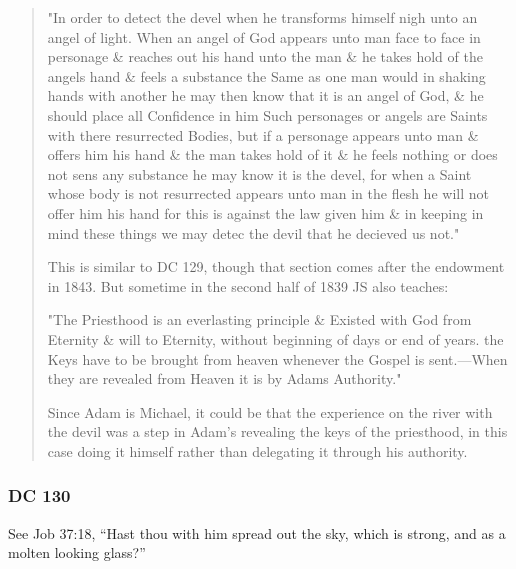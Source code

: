 \begin{compactdesc}
\begin{compactdesc}
\begin{quote}
				"In order to detect the devel when he transforms himself nigh unto an angel of light. When an angel of God appears unto man face to face in personage \& reaches out his hand unto the man \& he takes hold of the angels hand \& feels a substance the Same as one man would in shaking hands with another he may then know that it is an angel of God, \& he should place all Confidence in him Such personages or angels are Saints with there resurrected Bodies, but if a personage appears unto man \& offers him his hand \& the man takes hold of it \& he feels nothing or does not sens any substance he may know it is the devel, for when a Saint whose body is not resurrected appears unto man in the flesh he will not offer him his hand for this is against the law given him \& in keeping in mind these things we may detec the devil that he decieved us not."

				This is similar to DC 129, though that section comes after the endowment in 1843. But sometime in the second half of 1839 JS also teaches:

				"The Priesthood is an everlasting principle \& Existed with God from Eternity \& will to Eternity, without beginning of days or end of years. the Keys have to be brought from heaven whenever the Gospel is sent.---When they are revealed from Heaven it is by Adams Authority."

				Since Adam is Michael, it could be that the experience on the river with the devil was a step in Adam's revealing the keys of the priesthood, in this case doing it himself rather than delegating it through his authority.
			\end{quote}
		\end{compactdesc}
		
		\end{compactdesc}
		
	\subsubsection{DC 130} %
	
		\begin{compactdesc}
		
		\item[9$\vert$]
		\begin{compactdesc}
		\item[will be made like unto crystal] See Job 37:18, ``Hast thou with him spread out the sky, which is strong, and as a molten looking glass?''
		\end{compactdesc}
		
		\end{compactdesc}
		
